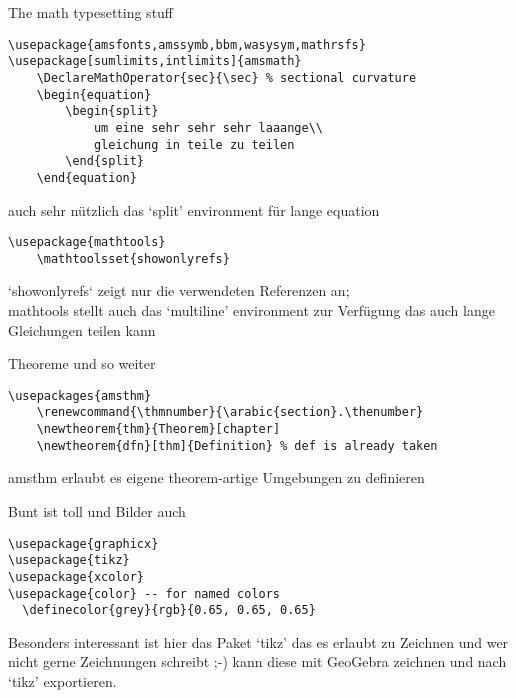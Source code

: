 \documentclass{beamer}
\begin{document}
\begin{frame}[fragile]{The math typesetting stuff}
    \footnotesize
\begin{verbatim}
\usepackage{amsfonts,amssymb,bbm,wasysym,mathrsfs}
\usepackage[sumlimits,intlimits]{amsmath}
    \DeclareMathOperator{sec}{\sec} % sectional curvature
    \begin{equation}
        \begin{split}
            um eine sehr sehr sehr laaange\\
            gleichung in teile zu teilen
        \end{split}
    \end{equation}
\end{verbatim}
\vspace*{-.3cm}
\normalsize
auch sehr nützlich das ‘split’ environment für lange equation
\footnotesize
\begin{verbatim}
\usepackage{mathtools}
    \mathtoolsset{showonlyrefs}
\end{verbatim}
\vspace*{-.3cm}
\normalsize
‘showonlyrefs‘ zeigt nur die verwendeten Referenzen an;\\
mathtools stellt auch das ‘multiline’ environment zur Verfügung das auch
lange Gleichungen teilen kann
\end{frame}

\begin{frame}[fragile]{Theoreme und so weiter}
\footnotesize
\begin{verbatim}
\usepackages{amsthm}
    \renewcommand{\thmnumber}{\arabic{section}.\thenumber}
    \newtheorem{thm}{Theorem}[chapter]
    \newtheorem{dfn}[thm]{Definition} % def is already taken
\end{verbatim}
amsthm erlaubt es eigene theorem-artige Umgebungen zu definieren
\end{frame}

\begin{frame}[fragile]{Bunt ist toll und Bilder auch}
\footnotesize
\begin{verbatim}
\usepackage{graphicx}
\usepackage{tikz}
\usepackage{xcolor}
\usepackage{color} -- for named colors
  \definecolor{grey}{rgb}{0.65, 0.65, 0.65}
\end{verbatim}
\normalsize
Besonders interessant ist hier das Paket ‘tikz’ das es erlaubt zu Zeichnen und
wer nicht gerne Zeichnungen schreibt ;-) kann diese mit GeoGebra zeichnen und
nach ‘tikz’ exportieren.
\end{frame}
\end{document}

